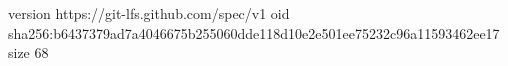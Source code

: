 version https://git-lfs.github.com/spec/v1
oid sha256:b6437379ad7a4046675b255060dde118d10e2e501ee75232c96a11593462ee17
size 68
